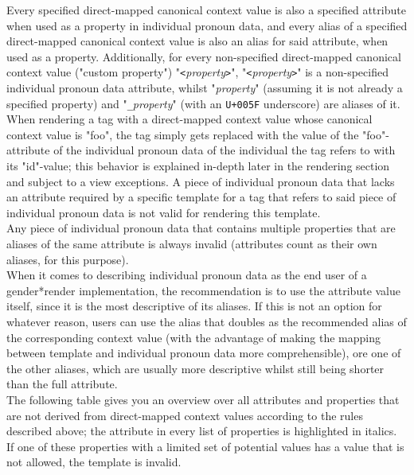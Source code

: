 \documentclass{article}
\newcommand{\GenderRender}{
    gender*render
}
\begin{document}
    Every specified direct-mapped canonical context value is also a specified attribute when used as a property in individual pronoun data, and every alias of a specified direct-mapped canonical context value is also an alias for said attribute, when used as a property.
    Additionally, for every non-specified direct-mapped canonical context value ("custom property") "\texttt{<}\emph{property}\texttt{>}", "\texttt{<}\emph{property}\texttt{>}" is a non-specified individual pronoun data attribute, whilst "\emph{property}" (assuming it is not already a specified property) and "\texttt{\_}\emph{property}" (with an \texttt{U+005F} underscore) are aliases of it.\\

    When rendering a tag with a direct-mapped context value whose canonical context value is "foo", the tag simply gets replaced with the value of the "foo"-attribute of the individual pronoun data of the individual the tag refers to with its "id"-value;
    this behavior is explained in-depth later in the rendering section and subject to a view exceptions.
    A piece of individual pronoun data that lacks an attribute required by a specific template for a tag that refers to said piece of individual pronoun data is not valid for rendering this template.\\

    Any piece of individual pronoun data that contains multiple properties that are aliases of the same attribute is always invalid (attributes count as their own aliases, for this purpose).\\

    When it comes to describing individual pronoun data as the end user of a \GenderRender implementation, the recommendation is to use the attribute value itself, since it is the most descriptive of its aliases.
    If this is not an option for whatever reason, users can use the alias that doubles as the recommended alias of the corresponding context value (with the advantage of making the mapping between template and individual pronoun data more comprehensible), ore one of the other aliases, which are usually more descriptive whilst still being shorter than the full attribute.\\

    The following table gives you an overview over all attributes and properties that are not derived from direct-mapped context values according to the rules described above;
    the attribute in every list of properties is highlighted in italics.
    If one of these properties with a limited set of potential values has a value that is not allowed, the template is invalid.\\
\end{document}
